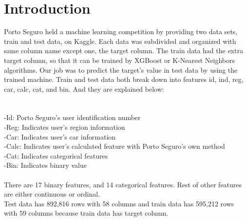 \documentclass[fleqn,10pt]{SelfArx} %
\affiliation{\textsuperscript{1}\textit{Computer Science, School of Informatics , Computing and Engineering, Indiana University, Bloomington, IN, USA}} %
\begin{document}
\flushbottom %

\maketitle %

\tableofcontents %

\thispagestyle{empty} %






\section{Introduction} %

\hspace{\parindent} Porto Seguro held a machine learning competition by providing two data sets, train and test data, on Kaggle. Each data was  subdivided and organized with same column name except one, the target column. The train data had the extra target column, so that it can be trained by XGBoost or K-Nearest Neighbors algorithms. Our job was to predict the target’s value in test data by using the trained machine. Train and test data both break down into features id, ind, reg, car, calc, cat, and bin. And they are explained below: \\ \\ \\
-Id: Porto Seguro’s user identification number \\
-Reg: Indicates user’s region information \\
-Car: Indicates user’s car information \\
-Calc: Indicates user’s calculated feature with Porto Seguro’s own method \\
-Cat: Indicates categorical features \\
-Bin: Indicates binary value \\ \\
There are 17 binary features, and 14 categorical features. Rest of other features are either continuous or ordinal. \\
Test data has 892,816 rows with 58 columns and train data has 595,212 rows with 59 columns because train data has target column.
\end{document}
